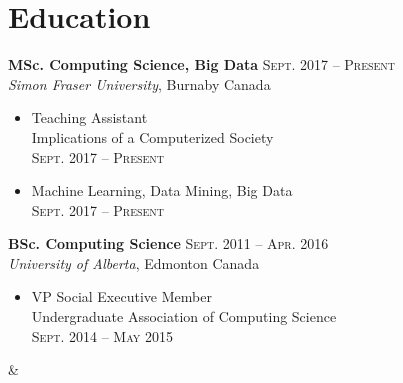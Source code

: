 \documentclass[10pt]{article} %
\begin{document}
\begin{minipage}[t]{0.43\textwidth}
\section{Education} 


\textbf{MSc. Computing Science, Big Data} \hfill \textsc{Sept. 2017 -- Present}\\ 
\textit{Simon Fraser University}, Burnaby Canada
\begin{itemize}
    \item  Teaching Assistant \\ 
         Implications of a Computerized Society \\
    \textsc{Sept. 2017 -- Present}
    \item  Machine Learning, Data Mining, Big Data \\ 
    \textsc{Sept. 2017 -- Present}\\

\end{itemize}

\textbf{BSc. Computing Science} \hfill \textsc{Sept. 2011 -- Apr. 2016}\\ 
\textit{University of Alberta}, Edmonton Canada
\begin{itemize}
    \item  VP Social Executive Member\\Undergraduate Association of Computing Science \\ 
    \textsc{Sept. 2014 -- May 2015}
\end{itemize}
&\\


 
\end{minipage} %
\hfill
\end{document}
